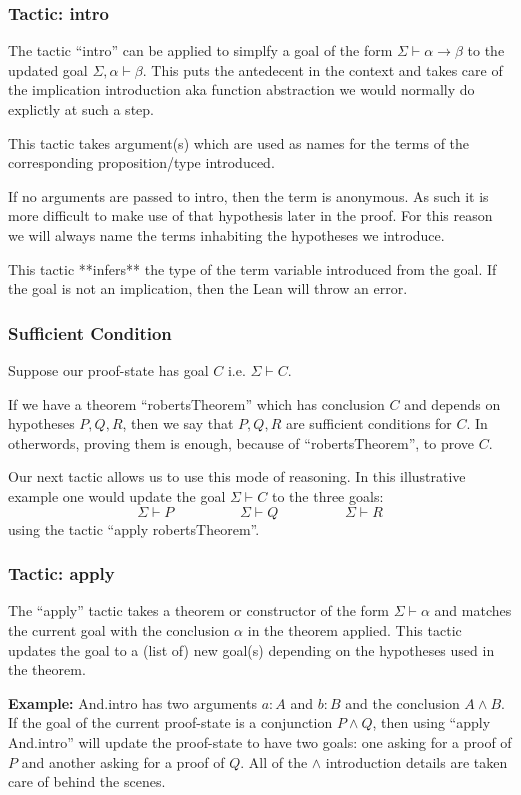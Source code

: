 \documentclass{beamer}
\theoremstyle{indentDefn} \newtheorem{defn}[]{Definition}
\begin{document}
\begin{frame}
	\frametitle{Tactic: intro}
	
	The tactic ``intro'' can be applied to simplfy a goal of the form $\Sigma \vdash \alpha \to \beta$ to the updated goal $\Sigma, \alpha \vdash \beta$. This puts the antedecent in the context and takes care of the implication introduction aka function abstraction we would normally do explictly at such a step. 
	
	This tactic takes argument(s) which are used as names for the terms of the corresponding proposition/type introduced. 
	
	If no arguments are passed to intro, then the term is anonymous. As such it is more difficult to make use of that hypothesis later in the proof. For this reason we will always name the terms inhabiting the hypotheses we introduce.
	
	This tactic **infers** the type of the term variable introduced from the goal. If the goal is not an implication, then the Lean will throw an error.
\end{frame}

\begin{frame}
	\frametitle{Sufficient Condition}
	
	Suppose our proof-state has goal $C$ i.e. $\Sigma \vdash C$. 
	
	If we have a theorem ``robertsTheorem'' which has conclusion $C$ and depends on hypotheses $P,Q,R$, then we say that $P,Q,R$ are sufficient conditions for $C$. In otherwords, proving them is enough, because of ``robertsTheorem'', to prove $C$. 
	
	Our next tactic allows us to use this mode of reasoning. In this illustrative example one would update the goal $\Sigma \vdash C$ to the three goals: 
	$$\Sigma \vdash P \hspace{2cm} \Sigma \vdash Q \hspace{2cm} \Sigma \vdash R$$
	using the tactic ``apply robertsTheorem''.
\end{frame}

\begin{frame}
	\frametitle{Tactic: apply}
	
	The ``apply'' tactic takes a theorem or constructor of the form $\Sigma \vdash \alpha$ and matches the current goal with the conclusion $\alpha$ in the theorem applied. This tactic updates the goal to a (list of) new goal(s) depending on the hypotheses used in the theorem. 
	
	{\bf Example:} And.intro has two arguments $a : A$ and $b : B$ and the conclusion $A \land B$. If the goal of the current proof-state is a conjunction $P \land Q$, then using ``apply And.intro'' will update the proof-state to have two goals: one asking for a proof of $P$ and another asking for a proof of $Q$. All of the $\land$ introduction details are taken care of behind the scenes.

\end{frame}
\end{document}
